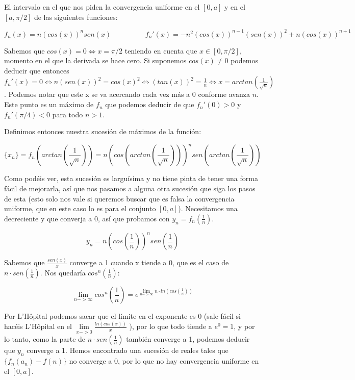 
El intervalo en el que nos piden la convergencia uniforme en el $[0, a]$ y en el $[a, \pi/2]$ de las siguientes funciones:

$$f_n(x) = n(cos(x))^nsen(x) \hspace{2cm} f_n'(x) = -n^2(cos(x))^{n-1}(sen(x))^2 + n(cos(x))^{n+1}$$

Sabemos que $cos(x) = 0 \iff x = \pi/2$ teniendo en cuenta que $x\in [0, \pi/2]$, momento en el que la derivada se hace cero. Si suponemos $cos(x) \neq 0$ podemos deducir que entonces $f_n'(x) = 0 \iff n(sen(x))^2 = cos(x)^2 \iff (tan(x))^2 = \frac{1}{n} \iff x = arctan\left(\frac{1}{\sqrt n}\right)$. Podemos notar que este x se va acercando cada vez más a 0 conforme avanza $n$. Este punto es un máximo de $f_n$ que podemos deducir de que $f_n'(0) > 0$ y $f_n'(\pi/4) < 0$ para todo $ n > 1$.

Definimos entonces nuestra sucesión de máximos de la función:

$$\{x_n\} = f_n\left(arctan\left(\frac{1}{\sqrt n}\right)\right) = n\left(cos\left(arctan\left(\frac{1}{\sqrt n}\right)\right)\right)^nsen\left(arctan\left(\frac{1}{\sqrt n}\right)\right)$$

Como podéis ver, esta sucesión es larguísima y no tiene pinta de tener una forma fácil de mejorarla, así que nos pasamos a alguna otra sucesión que siga los pasos de esta (esto solo nos vale si queremos buscar que es falsa la convergencia uniforme, que en este caso lo es para el conjunto $[0,a]$). Necesitamos una decreciente y que converja a 0, así que probamos con $y_n = f_n\left(\frac{1}{n}\right)$.

$$y_n = n\left(cos\left(\frac{1}{n}\right)\right)^nsen\left(\frac{1}{n}\right)$$

Sabemos que $\frac{sen(x)}{x}$ converge a 1 cuando x tiende a 0, que es el caso de $n\cdot sen\left(\frac{1}{n}\right)$. Nos quedaría $cos^n\left(\frac{1}{n}\right)$:

$$\lim\limits_{n->\infty} cos^n\left(\frac{1}{n}\right) = e^{\lim\limits_{n->\infty}n\cdot ln\left(cos\left(\frac{1}{n}\right)\right)}$$

Por L'Hôpital podemos sacar que el límite en el exponente es 0 (sale fácil si hacéis L'Hôpital en el $\lim\limits_{x->0}\frac{ln(cos(x))}{x}$ ), por lo que todo tiende a $e^0 = 1$, y por lo tanto, como la parte de $n\cdot sen\left(\frac{1}{n}\right)$ también converge a 1, podemos deducir que $y_n$ converge a 1. Hemos encontrado una sucesión de reales tales que $\{f_n(a_n)-f(n)\}$ no converge a 0, por lo que no hay convergencia uniforme en el $[0,a]$.

